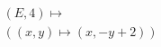 \documentclass[preview]{standalone}
\begin{document}
\begin{align*}
&(E,4) \mapsto \\&( (x,y) \mapsto (x, -y + 2))
\end{align*}
\end{document}
